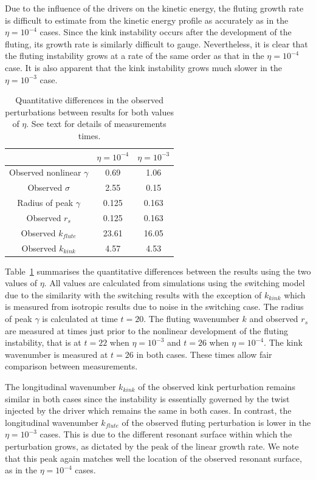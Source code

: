 Due to the influence of the drivers on the kinetic energy, the fluting growth rate is difficult to estimate from the kinetic energy profile as accurately as in the $\eta=10^{-4}$ cases. Since the kink instability occurs after the development of the fluting, its growth rate is similarly difficult to gauge. Nevertheless, it is clear that the fluting instability grows at a rate of the same order as that in the $\eta=10^{-4}$ case. It is also apparent that the kink instability grows much slower in the $\eta=10^{-3}$ case.

\begin{table}[]
\centering
\begin{tabular}{ccc}
&
$\eta=10^{-4}$ &
$\eta=10^{-3}$ \\
\midrule
Observed nonlinear $\gamma$ & 0.69 & 1.06  \\
Observed $\sigma$ & 2.55 & 0.15\\
\midrule
Radius of peak $\gamma$ & 0.125 & 0.163 \\
Observed $r_s$ & 0.125 & 0.163 \\
\midrule
Observed $k_{flute}$ & 23.61 & 16.05 \\
Observed $k_{kink}$ & 4.57 & 4.53 \\
\end{tabular}
\caption{Quantitative differences in the observed perturbations between results for both values of $\eta$. See text for details of measurements times.}
\label{tab:kink_fluting_params}
\end{table}

Table~\ref{tab:kink_fluting_params} summarises the quantitative differences between the results using the two values of $\eta$. All values are calculated from simulations using the switching model due to the similarity with the switching results with the exception of $k_{kink}$ which is measured from isotropic results due to noise in the switching case. The radius of peak $\gamma$ is calculated at time $t=20$. The fluting wavenumber $k$ and observed $r_s$ are measured at times just prior to the nonlinear development of the fluting instability, that is at $t=22$ when $\eta=10^{-3}$ and $t=26$ when $\eta = 10^{-4}$. The kink wavenumber is measured at $t=26$ in both cases. These times allow fair comparison between measurements.

The longitudinal wavenumber $k_{kink}$ of the observed kink perturbation remains similar in both cases since the instability is essentially governed by the twist injected by the driver which remains the same in both cases. In contrast, the longitudinal wavenumber $k_{flute}$ of the observed fluting perturbation is lower in the $\eta=10^{-3}$ cases. This is due to the different resonant surface within which the perturbation grows, as dictated by the peak of the linear growth rate. We note that this peak again matches well the location of the observed resonant surface, as in the $\eta=10^{-4}$ cases.


